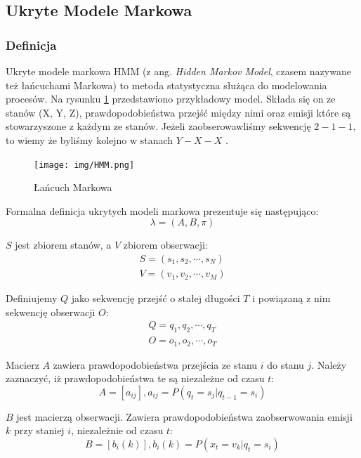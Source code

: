 \subsection{Ukryte Modele Markowa}

\subsubsection{Definicja}
Ukryte modele markowa HMM (z ang. \textit{Hidden Markov Model}, czasem nazywane też łańcuchami Markowa) to metoda statystyczna służąca do modelowania procesów.
Na rysunku \ref{fig:lancuch_markova} przedstawiono przykładowy model.
Składa się on ze stanów (X, Y, Z), prawdopodobieństwa przejść między nimi oraz emisji które są stowarzyszone z każdym ze stanów.
Jeżeli zaobserowawliśmy sekwencję $2-1-1$, to wiemy że byliśmy kolejno w stanach $Y-X-X$ \cite{blunsom2004}. 

\begin{figure}[h!]
    \centering
    \texttt{[image: img/HMM.png]}
    \caption{Łańcuch Markowa}
    \label{fig:lancuch_markova}
\end{figure}

\newpage

Formalna definicja ukrytych modeli markowa prezentuje się następująco:
\begin{equation}
    \lambda = (A,B,\pi)
\end{equation}

$S$ jest zbiorem stanów, a $V$ zbiorem obserwacji:
\begin{align}
    S = (s_{1}, s_{2}, \cdots, s_{N}) \\
    V = (v_{1}, v_{2}, \cdots, v_{M}) 
\end{align}

Definiujemy $Q$ jako sekwencję przejść o stałej długości $T$ i powiązaną z nim sekwencję obserwacji $O$:
\begin{align}
    Q = q_{1}, q_{2}, \cdots, q_{T} \\
    O = o_{1}, o_{2}, \cdots, o_{T}
\end{align}

Macierz $A$ zawiera prawdopodobieństwa przejścia ze stanu $i$ do stanu $j$. Należy zaznaczyć, iż prawdopodobieństwa te są niezależne od czasu $t$:
\begin{equation}
    A = [a_{ij}], a_{ij} = P(q_{t} = s_{j} | q_{t-1} = s_{i})
\end{equation}

$B$ jest macierzą obserwacji. Zawiera prawdopodobieństwa zaobserwowania emisji $k$ przy staniej $i$, niezależnie od czasu $t$:
\begin{equation}
    B = [b_{i}(k)], b_{i}(k) = P (x_{t} = v_{k} | q_{t} = s_{i})
\end{equation}

